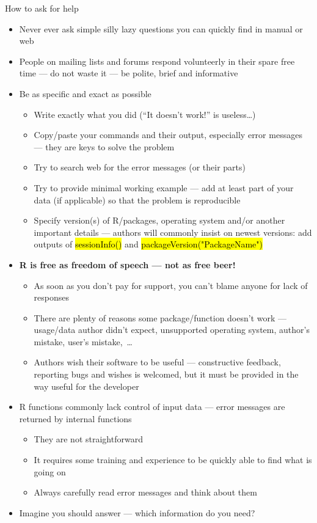 \documentclass[compress, ucs, xelatex, 11pt, xcolor=svgnames,
	hyperref={
		bookmarks=true,
		unicode=true,
		colorlinks=true,
		pdftitle={Molecular data in R},
		plainpages=false,
		pdfauthor={Vojtech Zeisek},
		pdfsubject={Course about phylogeny and evolution in R},
		pdfcreator={XeLaTeX},
		pdfkeywords={R, evolution, phylogeny, molecular data},
		linkcolor=Tomato,
		anchorcolor=SaddleBrown,
		citecolor=Goldenrod,
		filecolor=DarkMagenta,
		menucolor=Sienna,
		urlcolor=DarkTurquoise,
		pdftex},
	url={hyphens, lowtilde} %
	]{beamer}
\renewcommand{\texttt}[1]{\hl{\ttfamily #1}}
\begin{document}
\begin{frame}[allowframebreaks]{How to ask for help}
	\label{howtoask}
	\begin{itemize}
		\item \alert{Never ever} ask simple silly lazy questions you can quickly find in manual or web
		\item People on mailing lists and forums respond volunteerly in their spare free time --- do not waste it --- be polite, brief and informative
		\item Be as specific and exact as possible
		\begin{itemize}
			\item Write \alert{exactly} what you did (``It doesn't work!'' is useless\ldots)
			\item Copy/paste your commands and their output, especially error messages --- they are keys to solve the problem
			\item Try to search web for the error messages (or their parts)
			\item Try to provide minimal working example --- add at least part of your data (if applicable) so that the problem is reproducible
			\item Specify version(s) of R/packages, operating system and/or another important details --- authors will commonly insist on newest versions: add outputs of \texttt{sessionInfo()} and \texttt{packageVersion("PackageName")}
		\end{itemize}
		\item \textbf{R is free as freedom of speech --- not as free beer!}
		\begin{itemize}
			\item As soon as you don't pay for support, you can't blame anyone for lack of responses
			\item There are plenty of reasons some package/function doesn't work --- usage/data author didn't expect, unsupported operating system, author's mistake, user's mistake,~\ldots
			\item Authors wish their software to be useful --- constructive feedback, reporting bugs and wishes is welcomed, but it must be provided in the way useful for the developer
		\end{itemize}
		\item R functions commonly lack control of input data --- error messages are returned by internal functions
		\begin{itemize}
			\item They are not straightforward
			\item It requires some training and experience to be quickly able to find what is going on
			\item Always carefully read error messages and think about them
		\end{itemize}
		\item Imagine you should answer --- which information do you need?
	\end{itemize}
\end{frame}
\end{document}
